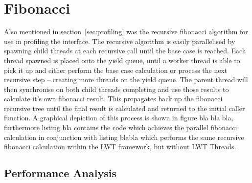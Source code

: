 \documentclass[12pt,twoside,notitlepage]{report}
\begin{document}
\section{Fibonacci}
\label{sec:fibonacci}
%
%
Also mentioned in section~\ref{sec:profiling} was the recursive fibonacci algorithm for use in profiling the interface. The recursive algorithm is easily parallelised by spawning child threads at each recursive call until the base
case is reached. Each thread spawned is placed onto the yield queue, until a worker thread is able to pick it up and either perform the base case calculation or process the next recursive step -- creating more threads on the yield
queue.  The parent thread will then synchronise on both child threads completing and use those results to calculate it's own fibonacci result. This propagates back up the fibonacci recursive tree until the final result is calculated
and returned to the initial caller function. A graphical depiction of this process is shown in figure bla bla bla, furthermore listing bla  contains the code which achieves the parallel fibonacci calculation in conjunction with listing blabla which performs the same recursive fibonacci calculation within the LWT framework, but
without LWT Threads.

\subsection{Performance Analysis}
%
%
\end{document}
